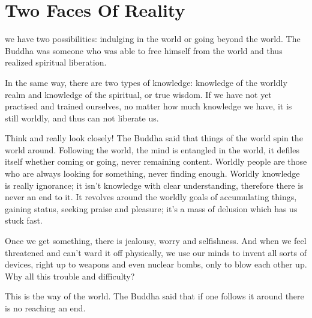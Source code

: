 
\chapter{Two Faces Of Reality}

 we have two possibilities: indulging in the world or going beyond the world. The Buddha was someone who was able to free himself from the world and thus realized spiritual liberation. 

In the same way, there are two types of knowledge: knowledge of the worldly realm and knowledge of the spiritual, or true wisdom. If we have not yet practised and trained ourselves, no matter how much knowledge we have, it is still worldly, and thus can not liberate us. 

Think and really look closely! The Buddha said that things of the world spin the world around. Following the world, the mind is entangled in the world, it defiles itself whether coming or going, never remaining content. Worldly people are those who are always looking for something, never finding enough. Worldly knowledge is really ignorance; it isn't knowledge with clear understanding, therefore there is never an end to it. It revolves around the worldly goals of accumulating things, gaining status, seeking praise and pleasure; it's a mass of delusion which has us stuck fast. 

Once we get something, there is jealousy, worry and selfishness. And when we feel threatened and can't ward it off physically, we use our minds to invent all sorts of devices, right up to weapons and even nuclear bombs, only to blow each other up. Why all this trouble and difficulty? 

This is the way of the world. The Buddha said that if one follows it around there is no reaching an end. 


